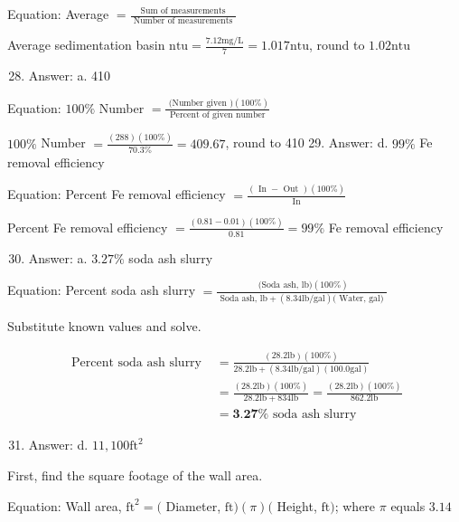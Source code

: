 \documentclass[10pt]{article}
\begin{document}
Equation: Average $=\frac{\text { Sum of measurements }}{\text { Number of measurements }}$

Average sedimentation basin $\mathrm{ntu}=\frac{7.12 \mathrm{mg} / \mathrm{L}}{7}=1.017 \mathrm{ntu}$, round to $1.02 \mathrm{ntu}$

\begin{enumerate}
  \setcounter{enumi}{27}
  \item Answer: a. 410
\end{enumerate}

Equation: $100 \%$ Number $=\frac{\text { (Number given })(100 \%)}{\text { Percent of given number }}$

$100 \%$ Number $=\frac{(288)(100 \%)}{70.3 \%}=409.67$, round to 410 29. Answer: d. $99 \%$ Fe removal efficiency

Equation: Percent Fe removal efficiency $=\frac{(\text { In }-\text { Out })(100 \%)}{\text { In }}$

Percent Fe removal efficiency $=\frac{(0.81-0.01)(100 \%)}{0.81}=99 \%$ Fe removal efficiency

\begin{enumerate}
  \setcounter{enumi}{29}
  \item Answer: a. $3.27 \%$ soda ash slurry
\end{enumerate}

Equation: Percent soda ash slurry $=\frac{\text { (Soda ash, } \mathrm{lb})(100 \%)}{\text { Soda ash, } \mathrm{lb}+(8.34 \mathrm{lb} / \mathrm{gal})(\text { Water, gal) }}$

Substitute known values and solve.

$$
\begin{aligned}
\text { Percent soda ash slurry } &=\frac{(28.2 \mathrm{lb})(100 \%)}{28.2 \mathrm{lb}+(8.34 \mathrm{lb} / \mathrm{gal})(100.0 \mathrm{gal})} \\
&=\frac{(28.2 \mathrm{lb})(100 \%)}{28.2 \mathrm{lb}+834 \mathrm{lb}}=\frac{(28.2 \mathrm{lb})(100 \%)}{862.2 \mathrm{lb}} \\
&=\mathbf{3 . 2 7 \%} \text { soda ash slurry }
\end{aligned}
$$

\begin{enumerate}
  \setcounter{enumi}{30}
  \item Answer: d. $11,100 \mathrm{ft}^{2}$
\end{enumerate}

First, find the square footage of the wall area.

Equation: Wall area, $\mathrm{ft}^{2}=($ Diameter, $\mathrm{ft})(\pi)($ Height, $\mathrm{ft})$; where $\pi$ equals $3.14$
\end{document}
